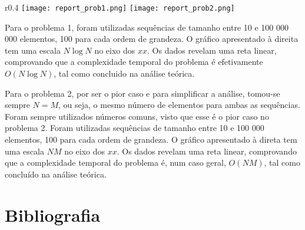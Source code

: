 \documentclass[12pt,a4paper]{article}
\begin{document}
  \begin{wrapfigure}{r}{0.4\textwidth}
    \centering
    \texttt{[image: report\_prob1.png]}
    \texttt{[image: report\_prob2.png]}
  \end{wrapfigure}

  Para o problema 1, foram utilizadas sequências de tamanho entre 10 e 100 000 000 elementos, 100 para cada ordem de grandeza.
  O gráfico apresentado à direita tem uma escala $N \log N$ no eixo dos $xx$.
  Os dados revelam uma reta linear, comprovando que a complexidade temporal do problema é efetivamente $O(N\log N)$, tal como concluido na análise teórica.

  Para o problema 2, por ser o pior caso e para simplificar a análise, tomou-se sempre $N = M$, ou seja, o mesmo número de elementos para ambas as sequências.
  Foram sempre utilizados números comuns, visto que esse é o pior caso no problema 2.
  Foram utilizadas sequências de tamanho entre 10 e 100 000 elementos, 100 para cada ordem de grandeza.
  O gráfico apresentado à direta tem uma escala $NM$ no eixo dos $xx$.
  Os dados revelam uma reta linear, comprovando que a complexidade temporal do problema é, num caso geral, $O(NM)$, tal como concluído na análise teórica.

  \section{Bibliografia}

  \printbibliography
\end{document}
